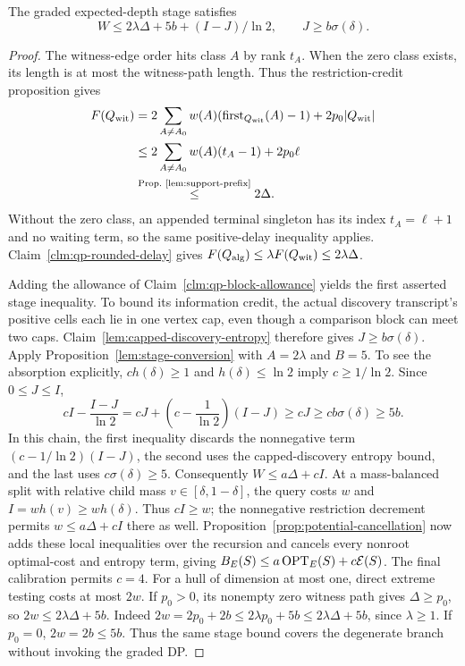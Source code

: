 \begin{claim}
\label{clm:qp-expected-stage}
The graded expected-depth stage satisfies
\[
 W\le2\lambda\Delta+5b+(I-J)/\ln2,\qquad
 J\ge b\sigma(\delta).
\]
\end{claim}
\begin{proof}
The witness-edge order hits class $A$ by rank $t_A$. When the zero
class exists, its length is at most the witness-path length. Thus
the restriction-credit proposition gives
\[
\begin{aligned}
 F(Q_{\rm wit})
 &=2\sum_{A\ne A_0}w(A)(\operatorname{first}_{Q_{\rm wit}}(A)-1)
     +2p_0|Q_{\rm wit}|
 \\
 &\le2\sum_{A\ne A_0}w(A)(t_A-1)+2p_0\ell\\
 &\byref{Prop.}{lem:support-prefix}{\le}2\Delta.
\end{aligned}
\]
Without the zero class, an
appended terminal singleton has its index $t_A=\ell+1$ and no
waiting term, so the same positive-delay inequality applies.
Claim~\ref{clm:qp-rounded-delay} gives $F(Q_{\rm alg})\le\lambda F(Q_{\rm wit})
\le2\lambda\Delta$.

Adding the allowance of Claim~\ref{clm:qp-block-allowance} yields the
first asserted stage inequality. To bound its information credit, the actual discovery transcript's
positive cells each lie in one vertex cap, even though a comparison
block can meet two caps. Claim~\ref{lem:capped-discovery-entropy} therefore gives
$J\ge b\sigma(\delta)$. Apply Proposition~\ref{lem:stage-conversion} with
$A=2\lambda$ and $B=5$. To see the absorption explicitly,
$ch(\delta)\ge1$ and $h(\delta)\le\ln2$ imply $c\ge1/\ln2$.
Since $0\le J\le I$,
\[
 cI-\frac{I-J}{\ln2}
 =cJ+\left(c-\frac1{\ln2}\right)(I-J)
 \ge cJ\ge cb\sigma(\delta)\ge5b.
\]
In this chain, the first inequality discards the nonnegative term
$(c-1/\ln2)(I-J)$, the second uses the capped-discovery entropy
bound, and the last uses $c\sigma(\delta)\ge5$. Consequently
$W\le a\Delta+cI$.
At a mass-balanced split with relative child mass
$v\in[\delta,1-\delta]$, the query costs $w$ and
$I=wh(v)\ge wh(\delta)$. Thus $cI\ge w$; the nonnegative
restriction decrement permits $w\le a\Delta+cI$ there as well.
Proposition~\ref{prop:potential-cancellation} now adds these local
inequalities over the recursion and cancels every nonroot
optimal-cost and entropy term, giving
$B_E(S)\le a\operatorname{OPT}_E(S)+c\mathcal E(S)$.
The final calibration permits $c=4$.
For a hull of dimension at most one, direct extreme testing costs at
most $2w$. If $p_0>0$, its nonempty zero witness path gives
$\Delta\ge p_0$, so $2w\le2\lambda\Delta+5b$.
Indeed $2w=2p_0+2b\le2\lambda p_0+5b
\le2\lambda\Delta+5b$, since $\lambda\ge1$.
If $p_0=0$, $2w=2b\le5b$. Thus the same stage bound covers the
degenerate branch without invoking the graded DP.
\end{proof}

